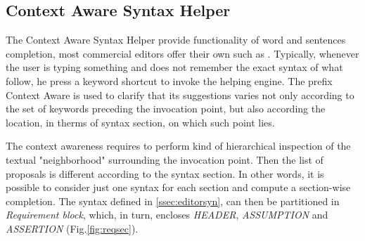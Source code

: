 \subsection{Context Aware Syntax Helper}
\label{sec:ctxhelper}

The Context Aware Syntax Helper provide functionality of word and sentences completion, most commercial editors offer their own such as \citep{IntelliSense}. Typically, whenever the user is typing something and does not remember the exact syntax of what follow, he press a keyword shortcut to invoke the helping engine. The prefix Context Aware is used to clarify that its suggestions varies not only according to the set of keywords preceding the invocation point, but also according the location, in therms of syntax section, on which such point lies. 
\par The context awareness requires to perform kind of hierarchical inspection of the textual "neighborhood" surrounding the invocation point. Then the list of proposals is different according to the syntax section. In other words, it is possible to consider just one syntax for each section and compute a section-wise completion. The syntax defined in \ref{ssec:editorsyn}, can then be partitioned in \textit{Requirement block}, which, in turn, encloses \textit{HEADER}, \textit{ASSUMPTION} and \textit{ASSERTION} (Fig.\ref{fig:reqsec}).

